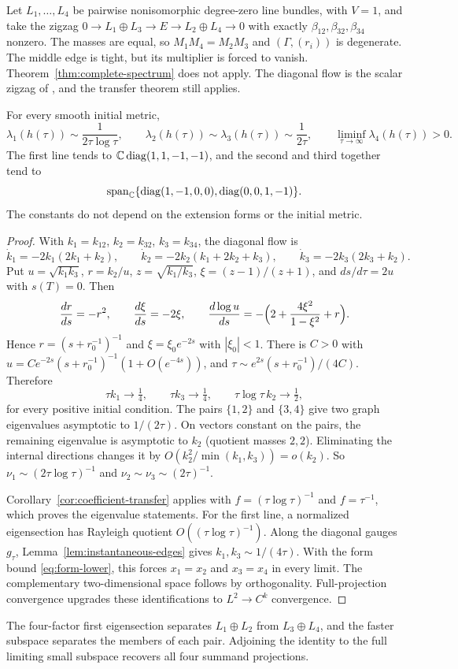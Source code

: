 Let $L_1,\ldots,L_4$ be pairwise nonisomorphic degree-zero line bundles,
with $V=1$, and take the zigzag $0\to L_1\oplus L_3\to E\to L_2\oplus L_4\to0$
with exactly $\beta_{12},\beta_{32},\beta_{34}$ nonzero. The masses are
equal, so $M_1M_4=M_2M_3$ and $(\Gamma,(r_i))$ is degenerate. The middle edge is
tight, but its multiplier is forced to vanish.
Theorem~\ref{thm:complete-spectrum} does not apply. The diagonal flow is
the scalar zigzag of \cite[Example~5.13]{HKKP2023}, and the transfer
theorem still applies.

\begin{theorem}\label{thm:zigzag-flow}
For every smooth initial metric,
\[
 \lambda_1(h(\tau))\sim\frac1{2\tau\log\tau},\qquad
 \lambda_2(h(\tau))\sim\lambda_3(h(\tau))\sim\frac1{2\tau},\qquad
 \liminf_{\tau\to\infty}\lambda_4(h(\tau))>0.
\]
The first line tends to $\mathbb C\operatorname{diag}(1,1,-1,-1)$, and the second and third
together tend to
\[
 \operatorname{span}_{\mathbb C}\{\operatorname{diag}(1,-1,0,0),\operatorname{diag}(0,0,1,-1)\}.
\]
The constants do not depend on the extension forms or the initial
metric.
\end{theorem}

\begin{proof}
With $k_1=k_{12}$, $k_2=k_{32}$, $k_3=k_{34}$, the diagonal flow is
\[
 \dot k_1=-2k_1(2k_1+k_2),\qquad\dot k_2=-2k_2(k_1+2k_2+k_3),\qquad
 \dot k_3=-2k_3(2k_3+k_2).
\]
Put $u=\sqrt{k_1k_3}$, $r=k_2/u$, $z=\sqrt{k_1/k_3}$, $\xi=(z-1)/(z+1)$,
and $ds/d\tau=2u$ with $s(T)=0$. Then
\[
 \frac{dr}{ds}=-r^2,\qquad\frac{d\xi}{ds}=-2\xi,\qquad
 \frac{d\log u}{ds}=-\Bigl(2+\frac{4\xi^2}{1-\xi^2}+r\Bigr).
\]
Hence $r=(s+r_0^{-1})^{-1}$ and $\xi=\xi_0e^{-2s}$ with $|\xi_0|<1$. There
is $C>0$ with $u=Ce^{-2s}(s+r_0^{-1})^{-1}(1+O(e^{-4s}))$, and
$\tau\sim e^{2s}(s+r_0^{-1})/(4C)$. Therefore
\[
 \tau k_1\to\tfrac14,\qquad\tau k_3\to\tfrac14,\qquad
 \tau\log\tau\,k_2\to\tfrac12,
\]
for every positive initial condition. The pairs $\{1,2\}$ and $\{3,4\}$
give two graph eigenvalues asymptotic to $1/(2\tau)$. On vectors constant on
the pairs, the remaining eigenvalue is asymptotic to $k_2$ (quotient masses
$2,2$). Eliminating the internal directions changes it by
$O(k_2^2/\min(k_1,k_3))=o(k_2)$. So
$\nu_1\sim(2\tau\log\tau)^{-1}$ and $\nu_2\sim\nu_3\sim(2\tau)^{-1}$.

Corollary~\ref{cor:coefficient-transfer} applies with
$f=(\tau\log\tau)^{-1}$ and $f=\tau^{-1}$, which proves the eigenvalue
statements. For the first line, a normalized eigensection has Rayleigh
quotient $O((\tau\log\tau)^{-1})$. Along the diagonal gauges $g_\tau$,
Lemma~\ref{lem:instantaneous-edges} gives $k_1,k_3\sim1/(4\tau)$. With the
form bound \eqref{eq:form-lower}, this forces $x_1=x_2$ and $x_3=x_4$ in
every limit. The
complementary two-dimensional space follows by orthogonality. Full-projection
convergence upgrades these identifications to $L^2\to C^k$ convergence.
\end{proof}

The four-factor first eigensection separates $L_1\oplus L_2$ from
$L_3\oplus L_4$, and the faster subspace separates the members of each
pair. Adjoining the identity to the full limiting small subspace recovers
all four summand projections.
